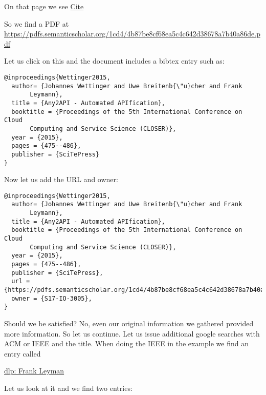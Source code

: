 On that page we see
\href{https://scholar.google.com/scholar_lookup?title=Automated+drug+dispensing+system+reduces+medication+errors+in+an+intensive+care+setting\&author=Chapuis\&publication_year=2010\#}{Cite}

So we find a PDF at
\url{https://pdfs.semanticscholar.org/1cd4/4b87be8cf68ea5c4c642d38678a7b40a86de.pdf}

Let us click on this and the document includes a bibtex entry such as:

\begin{verbatim}
@inproceedings{Wettinger2015, 
  author= {Johannes Wettinger and Uwe Breitenb{\"u}cher and Frank
       Leymann},
  title = {Any2API - Automated APIfication},
  booktitle = {Proceedings of the 5th International Conference on Cloud
       Computing and Service Science (CLOSER)},
  year = {2015},
  pages = {475--486},
  publisher = {SciTePress}
} 
\end{verbatim}

Now let us add the URL and owner:

\begin{verbatim}
@inproceedings{Wettinger2015, 
  author= {Johannes Wettinger and Uwe Breitenb{\"u}cher and Frank
       Leymann},
  title = {Any2API - Automated APIfication},
  booktitle = {Proceedings of the 5th International Conference on Cloud
       Computing and Service Science (CLOSER)},
  year = {2015},
  pages = {475--486},
  publisher = {SciTePress},
  url ={https://pdfs.semanticscholar.org/1cd4/4b87be8cf68ea5c4c642d38678a7b40a86de.pdf},
  owner = {S17-IO-3005},
} 
\end{verbatim}

Should we be satisfied? No, even our original information we gathered
provided more information. So let us continue. Let us issue additional
google searches with ACM or IEEE and the title. When doing the IEEE in the
example we find an entry called

\href{http://dblp.uni-trier.de\%2Fpers\%2Fl\%2FLeymann\%3AFrank\&usg=AFQjCNHCu-66qxWH0zRlPLr4DA8jIo5V-g\&sig2=1vYdnGOEiMcLBEMpbeBA7g}{dlp:
Frank Leyman}

Let us look at it and we find two entries:

